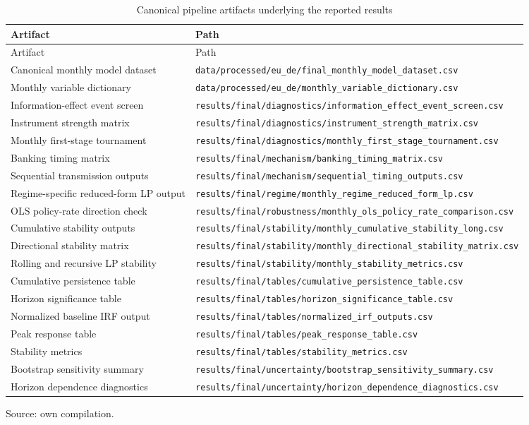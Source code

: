 \begingroup
{}\footnotesize
\setlength{\LTpre}{0.6em}
\setlength{\LTpost}{0pt}
\begin{longtable}{@{}p{}p{}@{}}
  \caption{Canonical pipeline artifacts underlying the reported results}
  \label{tab:artifact-registry}\\
  \toprule
  Artifact & Path \\
  \midrule
  \endfirsthead
  \toprule
  Artifact & Path \\
  \midrule
  \endhead
  \bottomrule
  \endlastfoot
    Canonical monthly model dataset & \nolinkurl{data/processed/eu_de/final_monthly_model_dataset.csv} \\
    Monthly variable dictionary & \nolinkurl{data/processed/eu_de/monthly_variable_dictionary.csv} \\
    Information-effect event screen & \nolinkurl{results/final/diagnostics/information_effect_event_screen.csv} \\
    Instrument strength matrix & \nolinkurl{results/final/diagnostics/instrument_strength_matrix.csv} \\
    Monthly first-stage tournament & \nolinkurl{results/final/diagnostics/monthly_first_stage_tournament.csv} \\
    Banking timing matrix & \nolinkurl{results/final/mechanism/banking_timing_matrix.csv} \\
    Sequential transmission outputs & \nolinkurl{results/final/mechanism/sequential_timing_outputs.csv} \\
    Regime-specific reduced-form LP output & \nolinkurl{results/final/regime/monthly_regime_reduced_form_lp.csv} \\
    OLS policy-rate direction check & \nolinkurl{results/final/robustness/monthly_ols_policy_rate_comparison.csv} \\
    Cumulative stability outputs & \nolinkurl{results/final/stability/monthly_cumulative_stability_long.csv} \\
    Directional stability matrix & \nolinkurl{results/final/stability/monthly_directional_stability_matrix.csv} \\
    Rolling and recursive LP stability & \nolinkurl{results/final/stability/monthly_stability_metrics.csv} \\
    Cumulative persistence table & \nolinkurl{results/final/tables/cumulative_persistence_table.csv} \\
    Horizon significance table & \nolinkurl{results/final/tables/horizon_significance_table.csv} \\
    Normalized baseline IRF output & \nolinkurl{results/final/tables/normalized_irf_outputs.csv} \\
    Peak response table & \nolinkurl{results/final/tables/peak_response_table.csv} \\
    Stability metrics & \nolinkurl{results/final/tables/stability_metrics.csv} \\
    Bootstrap sensitivity summary & \nolinkurl{results/final/uncertainty/bootstrap_sensitivity_summary.csv} \\
    Horizon dependence diagnostics & \nolinkurl{results/final/uncertainty/horizon_dependence_diagnostics.csv} \\
\end{longtable}
\vspace{-0.5em}
{\footnotesize Source: own compilation.\par}
\endgroup
